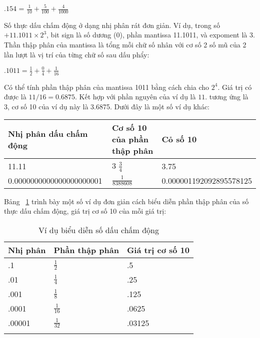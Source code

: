  		$.154$ = $\frac{1}{10} + \frac{5}{100} + \frac{4}{1000}$
 		
 	Số thực dấu chấm động ở dạng nhị phân rát đơn giản. Ví dụ, trong số $+11.1011 \times 2^3$, bit sign là số dương (0), phần mantissa 11.1011, và expoment là 3. Thần thập phân của mantissa là tổng mỗi chữ số nhân với cơ số 2 số mũ của 2 lần lượt là vị trí của từng chữ số sau dấu phẩy:
 	
 		$.1011 = \frac{1}{2}+ \frac{0}{4} + \frac{1}{16}$
 		
 		Có thể tính phần thập phân của mantissa 1011 bằng cách chia cho $2^4$. Giá trị có được là $11/16 = 0.6875$. Kết hợp với phần nguyên của ví dụ là $11.$ tương ứng là 3, cơ số 10 của ví dụ này là 3.6875. Dưới đây là một số ví dụ khác:
 		\begin{longtable}{|l|l|l|}
 			\hline 
 				Nhị phân dấu chấm động & Cơ số 10 của phần thập phân & Cỏ số 10 \\
 			\hline
 			\hline
 				11.11 & 3 $\frac{3}{4}$ & 3.75\\
 			\hline
 				0.0000000000000000000001 & $\frac{1}{8388608}$ & 0.000001192092895578125 \\
 			\hline
 		\end{longtable}
 		
 		Bảng ~\ref{tb:VDBinary} trình bày một số ví dụ đơn giản cách biểu diễn phần thập phân của số thực dấu chấm động, giá trị cơ số 10 của mỗi giá trị:
 		\begin{longtable}{|l|l|l|}
 			\hline
 				Nhị phân & Phần thập phân & Giá trị cơ số 10 \\
 			\hline
 			\hline
 				.1 & $\frac{1}{2}$ & .5 \\
 			\hline
 				.01 &$ \frac{1}{4}$ & .25 \\
 			\hline
 				.001 & $\frac{1}{8}$ & .125 \\
 			\hline
 				.0001 & $\frac{1}{16}$ &.0625 \\
 			\hline
 				.00001 & $\frac{1}{32}$ & .03125 \\ 			
 			\hline
 			\caption{Ví dụ biểu diễn số dấu chấm động}
 			\label{tb:VDBinary}
 		\end{longtable}
 		
